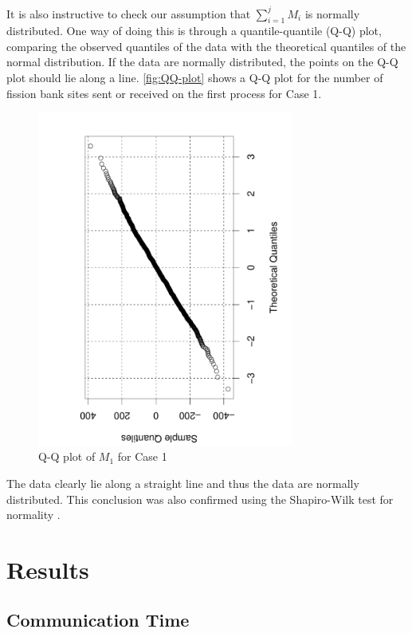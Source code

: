 It is also instructive to check our assumption that $\sum_{i=1}^j M_i$ is
normally distributed. One way of doing this is through a quantile-quantile (Q-Q)
plot, comparing the observed quantiles of the data with the theoretical
quantiles of the normal distribution. If the data are normally distributed, the
points on the Q-Q plot should lie along a line. \autoref{fig:QQ-plot} shows a
Q-Q plot for the number of fission bank sites sent or received on the first
process for Case 1.
\begin{figure}[ht!]
  \centering
  \includegraphics[width=0.75\textwidth,angle=-90]{figures/ch3/QQ_plot/QQplot.pdf}
  \caption{Q-Q plot of $M_1$ for Case 1}
  \label{fig:QQ-plot}
\end{figure}
The data clearly lie along a straight line and thus the data are normally
distributed. This conclusion was also confirmed using the Shapiro-Wilk test for
normality \cite{biometrika-shapiro-1965}.

\section{Results}
\label{sec:fission-bank-results}

\subsection{Communication Time}

